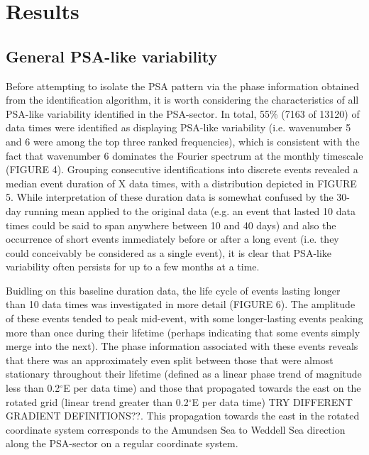 \section{Results}

\subsection{General PSA-like variability}

Before attempting to isolate the PSA pattern via the phase information obtained from the identification algorithm, it is worth considering the characteristics of all PSA-like variability identified in the PSA-sector. In total, 55\% (7163 of 13120) of data times were identified as displaying PSA-like variability (i.e. wavenumber 5 and 6 were among the top three ranked frequencies), which is consistent with the fact that wavenumber 6 dominates the Fourier spectrum at the monthly timescale (FIGURE 4). Grouping consecutive identifications into discrete events revealed a median event duration of X data times, with a distribution depicted in FIGURE 5. While interpretation of these duration data is somewhat confused by the 30-day running mean applied to the original data (e.g. an event that lasted 10 data times could be said to span anywhere between 10 and 40 days) and also the occurrence of short events immediately before or after a long event (i.e. they could conceivably be considered as a single event), it is clear that PSA-like variability often persists for up to a few months at a time.     

Buidling on this baseline duration data, the life cycle of events lasting longer than 10 data times was investigated in more detail (FIGURE 6). The amplitude of these events tended to peak mid-event, with some longer-lasting events peaking more than once during their lifetime (perhaps indicating that some events simply merge into the next). The phase information associated with these events reveals that there was an approximately even split between those that were almost stationary throughout their lifetime (defined as a linear phase trend of magnitude less than 0.2$^{\circ}$E per data time) and those that propagated towards the east on the rotated grid (linear trend greater than 0.2$^{\circ}$E per data time) TRY DIFFERENT GRADIENT DEFINITIONS??. This propagation towards the east in the rotated coordinate system corresponds to the Amundsen Sea to Weddell Sea direction along the PSA-sector on a regular coordinate system. 

